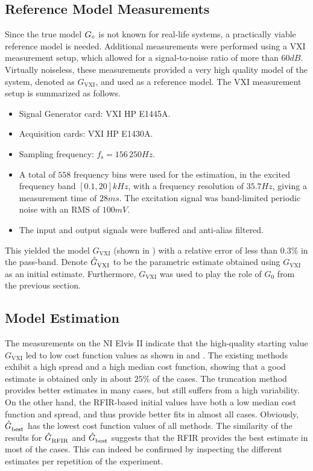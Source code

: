 \subsection{Reference Model Measurements}

Since the true model ${G}_{\circ}$ is not known for real-life systems, a practically viable reference model is needed.
Additional measurements were performed using a \gls{VXI} measurement setup, which allowed for a signal-to-noise ratio of more than $60\unit{dB}$. 
Virtually noiseless, these measurements provided a very high quality model of the system, denoted as $G_\mathrm{VXI}$, and used as a reference model. 
The \gls{VXI} measurement setup is summarized as follows.
\begin{itemize}
  \item Signal Generator card: \gls{VXI} HP E1445A.
  \item Acquisition cards: \gls{VXI} HP E1430A.
  \item Sampling frequency: $f_\mathrm{s} = 156\,250 \unit{Hz}$.
  \item A total of $558$ frequency bins were used for the estimation, in the excited frequency band $[0.1,20] \unit{kHz}$, with a frequency resolution of $35.7\unit{Hz}$, giving a measurement time of $28\unit{ms}$. The excitation signal was band-limited periodic noise with an \gls{RMS} of $100\unit{mV}$.
  \item The input and output signals were buffered and anti-alias filtered.
\end{itemize}
This yielded the model $G_\mathrm{VXI}$ (shown in ) with a relative error  of less than $0.3\%$ in the pass-band.  Denote $\hat{G}_{\mathrm{VXI}}^{\mathrm{}}$ to be the parametric estimate obtained using $G_{\mathrm{VXI}}$ as an initial estimate. Furthermore, $G_\mathrm{VXI}$ was used to play the role of $G_0$ from the previous section.

\subsection{Model Estimation}
  The measurements on the NI Elvis II indicate that the high-quality starting value $G_{\mathrm{VXI}}$ led to low cost function values as shown in  and .
  The existing methods exhibit a high spread and a high median cost function, showing that a good estimate is obtained only in about $25\%$ of the cases.
  The truncation method provides better estimates in many cases, but still suffers from a high variability.
  On the other hand, the \gls{RFIR}-based initial values have both a low median cost function and spread, and thus provide better fits in almost all cases.
  Obviously, $\hat{G}_{\mathrm{best}}^{\mathrm{}}$ has the lowest cost function values of all methods.
  The similarity of the results for $\hat{G}_{\mathrm{RFIR}}^{\mathrm{}}$ and $\hat{G}_{\mathrm{best}}^{\mathrm{}}$ suggests that the \gls{RFIR} provides the best estimate in most of the cases.
  This can indeed be confirmed by inspecting the different estimates per repetition of the experiment.

